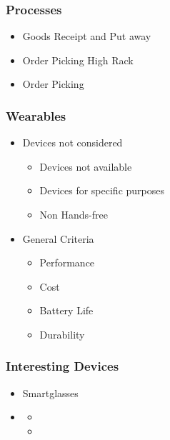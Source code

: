 \begin{frame}\frametitle{Processes}
	\begin{itemize}
		\item Goods Receipt and Put away
		\item Order Picking High Rack
		\item Order Picking \pause \checkmark
	\end{itemize}
\end{frame}

\begin{frame}\frametitle{Wearables}
	\begin{itemize}
		\item Devices not considered
		\begin{itemize}
			\item Devices not available
			\item Devices for specific purposes
			\item Non Hands-free
		\end{itemize}
		\item General Criteria
		\begin{itemize}
			\item Performance
			\item Cost
			\item Battery Life
			\item Durability
		\end{itemize}
	\end{itemize}
\end{frame}

\begin{frame}\frametitle{Interesting Devices}
	\begin{itemize}
		\item Smartglasses
		\item[] %
		\begin{itemize}
			\item[] %
			\item[] %
		\end{itemize}
	\end{itemize}
\end{frame}

